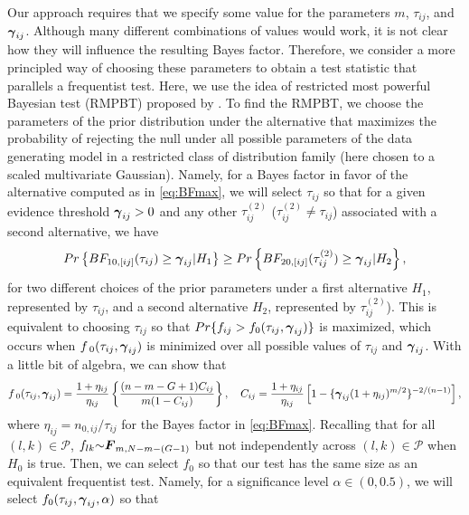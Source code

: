 \documentclass[pdflatex,sn-basic]{sn-jnl}%
\newcommand{\uF}       {\mbox{\boldmath$F$}}
\newcommand{\ugamma}            {\mbox{\boldmath$\gamma$}}
\theoremstyle{thmstyleone}%
\theoremstyle{thmstyletwo}%
\theoremstyle{thmstylethree}%
\begin{document}
Our approach requires that we specify some value for the parameters $m$, $\tau_{ij}$, and $\ugamma_{ij}$. Although many different combinations of values would work, it is not clear how they will influence the resulting Bayes factor. Therefore, we consider a more principled way of choosing these parameters to obtain a test statistic that parallels a frequentist test.   
Here, we use the idea of restricted most powerful Bayesian test (RMPBT) proposed by \cite{GoddardJohnson}. To find the RMPBT, we choose the parameters of the prior distribution under the alternative that maximizes the probability of rejecting the null under all possible parameters of the data generating model in a restricted class of distribution family (here chosen to a scaled multivariate Gaussian). Namely, for a Bayes factor in favor of the alternative computed as in \eqref{eq:BFmax}, we will select $\tau_{ij}$ so that for a given evidence threshold $\ugamma_{ij} > 0$ and any other $\tau^{(2)}_{ij}$ ($\tau^{(2)}_{ij} \neq \tau_{ij}$) associated with a second alternative, we have
$$Pr\left\{BF_{10,[ij]}(\tau_{ij}) \geq  \ugamma_{ij} | H_{1} \right\} \geq Pr\left\{BF_{20,[ij]}(\tau^{(2)}_{ij}) \geq \ugamma_{ij} | H_{2} \right\},$$
for two different choices of the prior parameters under a first alternative $H_1$, represented by $\tau_{ij}$, and a second alternative $H_2$, represented by $\tau^{(2)}_{ij}$). This is equivalent to choosing $\tau_{ij}$ so that $Pr\{f_{ij} > f_{0}(\tau_{ij},\ugamma_{ij})\}$ is maximized, which occurs when $f_{\;0}(\tau_{ij},\ugamma_{ij})$ is minimized over all possible values of $\tau_{ij}$ and $\ugamma_{ij}$. With a little bit of algebra, we can show that 
\begin{align*}
    f_{\;0}(\tau_{ij},\ugamma_{ij}) = \frac{1+\eta_{ij}}{\eta_{ij}} \left\{ \frac{(n - m -G+1)C_{ij}}{m(1 - C_{ij})} \right\},\quad
    C_{ij} = \frac{1+\eta_{ij}}{\eta_{ij}}\left[ 1 - \{\ugamma_{ij}(1+\eta_{ij})^{m/2} \}^{-2/(n-1)}  \right], 
\end{align*}
where $\eta_{ij} = n_{0,ij}/\tau_{ij}$ for the Bayes factor in \eqref{eq:BFmax}. 
Recalling that for all $(l,k) \in \mathcal{P}$, $f_{lk} {\sim} \uF_{m, N - m- (G-1)}$ but not independently across $(l, k)\in\mathcal{P}$ when $H_0$ is true. Then, we can select $f_{0}$ so that our test has the same size as an equivalent frequentist test. Namely, for a significance level $\alpha \in (0, 0.5)$, we will select $f_0(\tau_{ij},\ugamma_{ij}, \alpha)$ so that 
\end{document}
